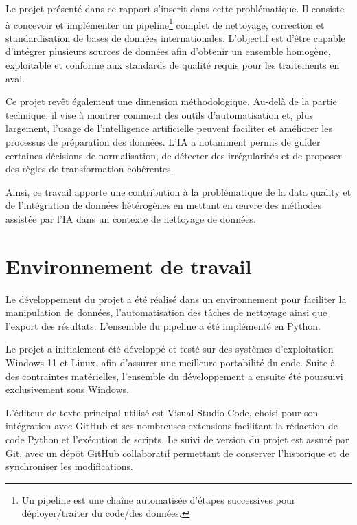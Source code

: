 \documentclass[a4paper, 12pt, twoside]{article}
\begin{document}
Le projet présenté dans ce rapport s’inscrit dans cette problématique. Il consiste à concevoir et implémenter un pipeline\footnote{Un pipeline est une chaîne automatisée d’étapes successives pour déployer/traiter du code/des données.} complet de nettoyage, correction et standardisation de bases de données internationales. L’objectif est d’être capable d’intégrer plusieurs sources de données afin d’obtenir un ensemble homogène, exploitable et conforme aux standards de qualité requis pour les traitements en aval.

Ce projet revêt également une dimension méthodologique. Au-delà de la partie technique, il vise à montrer comment des outils d’automatisation et, plus largement, l’usage de l’intelligence artificielle peuvent faciliter et améliorer les processus de préparation des données. L’IA a notamment permis de guider certaines décisions de normalisation, de détecter des irrégularités et de proposer des règles de transformation cohérentes.

Ainsi, ce travail apporte une contribution à la problématique de la data quality et de l’intégration de données hétérogènes en mettant en œuvre des méthodes assistée par l’IA dans un contexte de nettoyage de données.

\newpage
\section{Environnement de travail}
Le développement du projet a été réalisé dans un environnement pour faciliter la manipulation de données, l’automatisation des tâches de nettoyage ainsi que l’export des résultats. L’ensemble du pipeline a été implémenté en Python.

Le projet a initialement été développé et testé sur des systèmes d’exploitation Windows 11 et Linux, afin d’assurer une meilleure portabilité du code. Suite à des contraintes matérielles, l’ensemble du développement a ensuite été poursuivi exclusivement sous Windows.

L’éditeur de texte principal utilisé est Visual Studio Code, choisi pour son intégration avec GitHub et ses nombreuses extensions facilitant la rédaction de code Python et l’exécution de scripts. Le suivi de version du projet est assuré par Git, avec un dépôt GitHub collaboratif permettant de conserver l’historique et de synchroniser les modifications.
\end{document}
